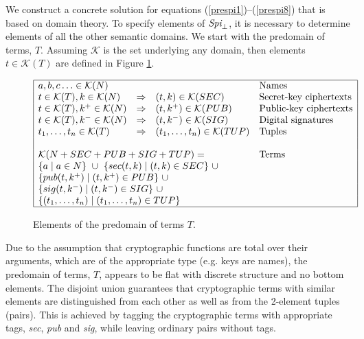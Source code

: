 \documentclass[10pt,a4paper,final,oneside,fleqn]{book}
\begin{document}
We construct a concrete solution for equations (\ref{prespi1})--(\ref{prespi8}) that is based on domain theory.  To specify elements of $\mbox{{\itshape Spi}}_\bot$, it is necessary to determine elements of all the other semantic domains.  We start with the predomain of terms, $T$.  Assuming $\mathcal{K}$ is the set underlying any domain, then elements $t\in\mathcal{K}(T)$ are defined in Figure \ref{semterms}.
\begin{figure}[bht]
\begin{center}
$\begin{array}{|llll|}\hline
a,b,c\ldots\in\mathcal{K}(N)&&&\mbox{Names}\\
t\in\mathcal{K}(T),k\in\mathcal{K}(N)&\Rightarrow&(t,k)\in\mathcal{K}(SEC)&\mbox{Secret-key ciphertexts}\\
t\in\mathcal{K}(T),k^+\in\mathcal{K}(N)&\Rightarrow&(t,k^+)\in\mathcal{K}(PUB)&\mbox{Public-key ciphertexts}\\
t\in\mathcal{K}(T),k^-\in\mathcal{K}(N)&\Rightarrow&(t,k^-)\in\mathcal{K}(SIG)&\mbox{Digital signatures}\\
t_1,\ldots,t_n\in\mathcal{K}(T)&\Rightarrow&(t_1,\ldots,t_n)\in\mathcal{K}(TUP)&\mbox{Tuples}\\
&&&\\
\multicolumn{3}{|l}{\mathcal{K}(N+SEC+PUB+SIG+TUP)=}&\mbox{Terms}\\
\multicolumn{4}{|l|}{\{a\mid a\in N\}~\cup~\{sec(t,k)\mid(t,k)\in SEC\}~\cup}\\
\multicolumn{4}{|l|}{\{pub(t,k^+)\mid(t,k^+)\in PUB\}~\cup}\\
\multicolumn{4}{|l|}{\{sig(t,k^-)\mid(t,k^-)\in SIG\}~\cup}\\
\multicolumn{4}{|l|}{\{(t_1,\ldots,t_n)\mid(t_1,\ldots,t_n)\in TUP\}}\\
\hline
\end{array}$
\end{center}
\caption{Elements of the predomain of terms $T$.\label{semterms}}
\end{figure}
Due to the assumption that cryptographic functions are total over their arguments, which are of the appropriate type (e.g. keys are names), the predomain of terms, $T$, appears to be flat with discrete structure and no bottom elements.  The disjoint union guarantees that cryptographic terms with similar elements are distinguished from each other as well as from the 2-element tuples (pairs). This is achieved by tagging the cryptographic terms with appropriate tags, {\itshape sec\/}, {\itshape pub\/} and {\itshape sig\/}, while leaving ordinary pairs without tags.
\end{document}
